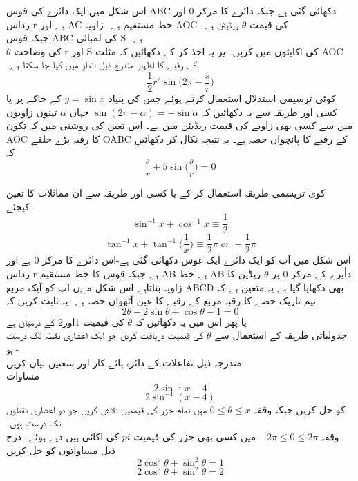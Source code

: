 اس شکل میں ایک دائرے کی قوس 
ABC
دکھائی گئی ہے جبکہ دائرے کا مرکز 
0
اور رداس
r
ہے اور
AC
خط مستقیم ہے۔ زاویہ 
AOC
کی قیمت
\(\theta\)
ریڈیئن ہے۔\\
جبکہ قوس 
ABC
کی لمبائی
S
ہے۔\\
\(\theta\)
کی وضاحت 
r
اور
S
کی اکایئوں میں کریں۔ پر یہ اخذ کر کے دکھائیں کہ مثلت
AOC
کے رقبے کا اظہار مندرج ذیل انداز میں کیا جا سکتا ہے۔\\
\[\frac{1}{2}r^{2}\sin{\Big(2\pi-\frac{s}{r}\Big)}\]
کوئی ترسیمی استدلال استعمال کرتے ہوئے جس کی بنیاد
\(y=\sin{x}\)
کے خاکے پر یا کسی اور طریقہ سے یہ دکھائیں کہ
\(\sin{(2\pi-\alpha)}=-\sin{\alpha}\)
جہاں
\(\alpha\)
تینوں زاویوں میں سے کسی بھی زاویے کی قیمت ریڈیئن میں ہے۔
اس تعین کی روشنی میں کہ تکون
AOC
کا رقبہ بڑے حلقے
OABC
کے رقبے کا پانچواں حصہ ہے۔ یہ نتیجہ نکال کر دکھائیں کہ\\
\[\frac{s}{r}+5\sin{\Big(\frac{s}{r}\Big)}=0\]

کوی تریسمی طریقہ استعمال کر کے یا کسی اور طریقہ سے  ان مماثلات کا تعین کیجئے-\\
\begin{equation*}
\sin^{-1}{x}+\cos^{-1}{x}\equiv\frac{1}{2}
\end{equation*}
\begin{equation*}
\tan^{-1}{x}+\tan^{-1}{\Big(\frac{1}{x}\Big)}\equiv\frac{1}{2}\pi \; or \; -\frac{1}{2}\pi
\end{equation*}
  اس شکل میں آپ کو ایک دائرے ایک غوس دکھائی گئی ہے-اس دائرے کا مرکز 0 ہے اور رداس 
  r
  ہے-جبکہ قوس کا خط مستقیم 
  AB
  ہے-خط 
  AB
   داٰٰٰیرے کے مرکز 0 پر
    \(\theta\)
 ریڈین کا زاویہ بناتاہے اس شکل مےں  اپ کو آپک مربع 
 ABCD
 بھی دکھایا گیا ہے یہ متعین ہے کہ نیم تاریک حصے کا رقبہ مربع کے رقبے کا عین آٹھواں حصہ ہے  -یہ ثابت کریں کہ\\
 \begin{equation*}
2\theta-2\sin{\theta}+\cos{\theta}-1=0
\end{equation*}
  یا پھر اس میں یہ دکھائیں کہ 
  \(\theta\)
   کی قیمیت 1اور2 کے درمیان ہے\\
    جدولیاتی طرہقہ کے استعمال سے 
   \(\theta\)
    کی قیمیت دریافت کریں جو ایک اعشاری نقطہ تک درست ہو -\\
     مندرجہ ذیل تفاعلات کے دائرہ ہائے کار اور سعتیں بیان کریں \\
   مساوات 
   \begin{equation*}
2\sin^{-1}{x}-4
\end{equation*}
\begin{equation*}
2\sin^{-1}{(x-4)}
\end{equation*}
   کو حل کرہں جبکہ وقفہ
   \(0\le\theta\le x\)
    مہں تمام جزر کی قیمتیں تلاش کریں جو دو اعشاری نقطوں تک درست ہوں۔\\
     وقفہ
     \(-2\pi\le 0\le 2\pi\)
      میں کسی بھی جزر کی قیمیت 
      \(pi\)
      کی اکائی ہیں دیے ہوئے۔ درج ذیل مساواتوں کو حل کریں \\
   \begin{equation*}
2\cos^{2}{\theta}+\sin^{2}{\theta}=1
\end{equation*}
\begin{equation*}
2\cos^{2}{\theta}+\sin^{2}{\theta}=2
\end{equation*}

